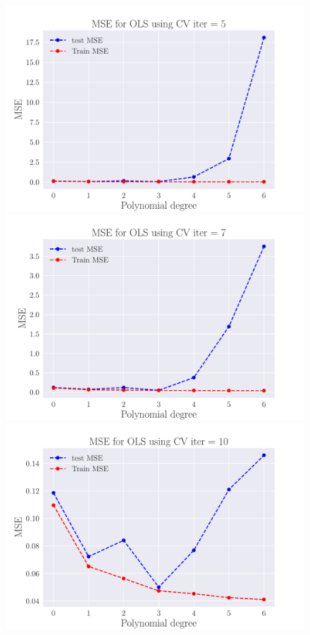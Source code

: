 \documentclass[reprint,english,notitlepage,aps,nobalancelastpage,nofootinbib]{revtex4-1}  %
\begin{document}
\begin{figure}[H]
	\includegraphics[width=\linewidth]{MSE_OLS_n30_eps02_pol6_CV_re5.pdf}
	\endminipage\hfill
	\includegraphics[width=\linewidth]{MSE_OLS_n30_eps02_pol6_CV_re7.pdf}
	\endminipage\hfill
	\includegraphics[width=\linewidth]{MSE_OLS_n30_eps02_pol6_CV_re10.pdf}

\end{figure}
\end{document}

